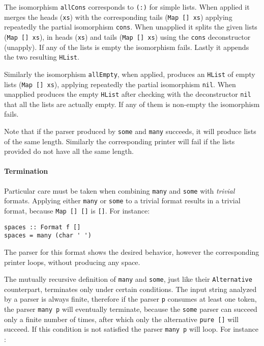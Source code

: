 \documentclass[../Thesis.tex]{subfiles}
\begin{document}

The isomorphism \texttt{allCons} corresponds to \texttt{(:)} for simple lists.
When applied it merges the heads (\texttt{xs}) with the corresponding tails (\texttt{Map [] xs}) applying repeatedly the partial isomorphism \texttt{cons}.
When unapplied it splits the given lists (\texttt{Map [] xs}), in heads (\texttt{xs}) and tails (\texttt{Map [] xs}) using the \texttt{cons} deconstructor (unapply). If any of the lists is empty the isomorphism fails.
Lastly it appends the two resulting \texttt{HList}.

Similarly the isomorphism \texttt{allEmpty}, when applied, produces an \texttt{HList} of empty lists (\texttt{Map [] xs}), applying repeatedly the partial isomorphism \texttt{nil}. When unapplied produces the empty \texttt{HList} after checking with the deconstructor \texttt{nil} that all the lists are actually empty. If any of them is non-empty the isomorphism fails.

Note that if the parser produced by \texttt{some} and \texttt{many} succeeds, it will produce lists of the same length. Similarly the corresponding printer will fail if the lists provided do not have all the same length.

\paragraph{Termination}

Particular care must be taken when combining \texttt{many} and \texttt{some}
with \emph{trivial} formats. Applying either \texttt{many} or \texttt{some} to a trivial format results in a trivial format, because \texttt{Map [] []} is \texttt{[]}. For instance:
\begin{verbatim}
spaces :: Format f []
spaces = many (char ' ')
\end{verbatim}

The parser for this format shows the desired behavior, however the corresponding printer loops, without producing any space.

The mutually recursive definition of \texttt{many} and \texttt{some}, just like their \texttt{Alternative} counterpart, terminates only under certain conditions.
The input string analyzed by a parser is always finite, therefore if the parser \texttt{p} consumes at least one token, the parser \texttt{many p} will eventually terminate, because the \texttt{some} parser can succeed only a finite number of times, after which only the alternative \texttt{pure []} will succeed. If this condition is not satisfied the parser \texttt{many p} will loop. 
For instance :
\end{document}

